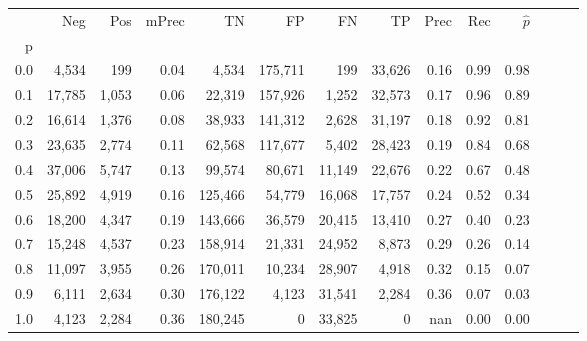 \begin{tabular}{rrrrrrrrrrrrrr}
\toprule
{} &     Neg &    Pos & mPrec &       TN &       FP &      FN &      TP &  Prec &   Rec & $\hat{p}$ \\
p   &         &        &       &          &          &         &         &       &       &           \\
\midrule
0.0 &   4,534 &    199 &  0.04 &    4,534 &  175,711 &     199 &  33,626 &  0.16 &  0.99 &      0.98 \\
0.1 &  17,785 &  1,053 &  0.06 &   22,319 &  157,926 &   1,252 &  32,573 &  0.17 &  0.96 &      0.89 \\
0.2 &  16,614 &  1,376 &  0.08 &   38,933 &  141,312 &   2,628 &  31,197 &  0.18 &  0.92 &      0.81 \\
0.3 &  23,635 &  2,774 &  0.11 &   62,568 &  117,677 &   5,402 &  28,423 &  0.19 &  0.84 &      0.68 \\
0.4 &  37,006 &  5,747 &  0.13 &   99,574 &   80,671 &  11,149 &  22,676 &  0.22 &  0.67 &      0.48 \\
0.5 &  25,892 &  4,919 &  0.16 &  125,466 &   54,779 &  16,068 &  17,757 &  0.24 &  0.52 &      0.34 \\
0.6 &  18,200 &  4,347 &  0.19 &  143,666 &   36,579 &  20,415 &  13,410 &  0.27 &  0.40 &      0.23 \\
0.7 &  15,248 &  4,537 &  0.23 &  158,914 &   21,331 &  24,952 &   8,873 &  0.29 &  0.26 &      0.14 \\
0.8 &  11,097 &  3,955 &  0.26 &  170,011 &   10,234 &  28,907 &   4,918 &  0.32 &  0.15 &      0.07 \\
0.9 &   6,111 &  2,634 &  0.30 &  176,122 &    4,123 &  31,541 &   2,284 &  0.36 &  0.07 &      0.03 \\
1.0 &   4,123 &  2,284 &  0.36 &  180,245 &        0 &  33,825 &       0 &   nan &  0.00 &      0.00 \\
\bottomrule
\end{tabular}
